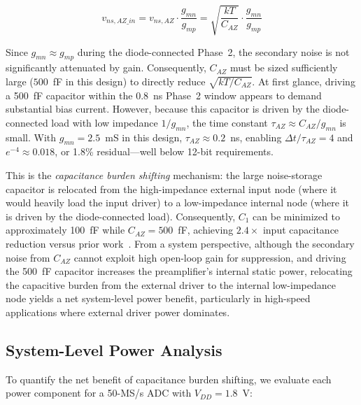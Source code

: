 \documentclass[journal]{IEEEtran}
\begin{document}
\begin{equation}
v_{ns,AZ\_in} = v_{ns,AZ} \cdot \frac{g_{mn}}{g_{mp}} = \sqrt{\frac{kT}{C_{AZ}}} \cdot \frac{g_{mn}}{g_{mp}}
\label{eq:caz_noise_ref}
\end{equation}

Since $g_{mn} \approx g_{mp}$ during the diode-connected Phase~2, the secondary noise is not significantly attenuated by gain. Consequently, $C_{AZ}$ must be sized sufficiently large ($500$~fF in this design) to directly reduce $\sqrt{kT/C_{AZ}}$. At first glance, driving a 500~fF capacitor within the 0.8~ns Phase~2 window appears to demand substantial bias current. However, because this capacitor is driven by the diode-connected load with low impedance $1/g_{mn}$, the time constant $\tau_{AZ} \approx C_{AZ}/g_{mn}$ is small. With $g_{mn}=2.5$~mS in this design, $\tau_{AZ} \approx 0.2$~ns, enabling $\Delta t/\tau_{AZ}=4$ and $e^{-4}\approx 0.018$, or 1.8\% residual---well below 12-bit requirements.

This is the \textit{capacitance burden shifting} mechanism: the large noise-storage capacitor is relocated from the high-impedance external input node (where it would heavily load the input driver) to a low-impedance internal node (where it is driven by the diode-connected load). Consequently, $C_1$ can be minimized to approximately 100~fF while $C_{AZ}=500$~fF, achieving $2.4\times$ input capacitance reduction versus prior work~\cite{liu202013bit}. From a system perspective, although the secondary noise from $C_{AZ}$ cannot exploit high open-loop gain for suppression, and driving the 500~fF capacitor increases the preamplifier's internal static power, relocating the capacitive burden from the external driver to the internal low-impedance node yields a net system-level power benefit, particularly in high-speed applications where external driver power dominates.

\subsection{System-Level Power Analysis}

To quantify the net benefit of capacitance burden shifting, we evaluate each power component for a 50-MS/s ADC with $V_{DD}=1.8$~V:
\end{document}
